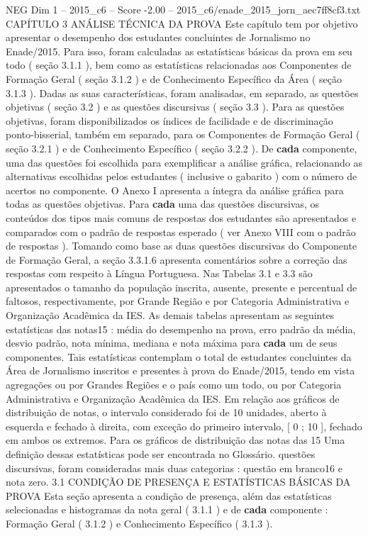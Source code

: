 \begin{textsample}{NEG Dim 1 – 2015\_c6 – Score -2.00 – 2015\_c6/enade\_2015\_jorn\_aec7ff8cf3.txt}  \label{ex:f1_neg_283}
CAPÍTULO 3 ANÁLISE TÉCNICA DA PROVA Este capítulo tem por objetivo apresentar o desempenho dos estudantes concluintes de Jornalismo no Enade/2015.
Para isso, foram calculadas as estatísticas básicas da prova em seu todo ( seção 3.1.1 ), bem como as estatísticas relacionadas aos Componentes de Formação Geral ( seção 3.1.2 ) e de Conhecimento Específico da Área ( seção 3.1.3 ).
Dadas as suas características, foram analisadas, em separado, as questões objetivas ( seção 3.2 ) e as questões discursivas ( seção 3.3 ).
Para as questões objetivas, foram disponibilizados os índices de facilidade e de discriminação ponto-bisserial, também em separado, para os Componentes de Formação Geral ( seção 3.2.1 ) e de Conhecimento Específico ( seção 3.2.2 ).
De \textbf{cada} componente, uma das questões foi escolhida para exemplificar a análise gráfica, relacionando as alternativas escolhidas pelos estudantes ( inclusive o gabarito ) com o número de acertos no componente.
O Anexo I apresenta a íntegra da análise gráfica para todas as questões objetivas.
Para \textbf{cada} uma das questões discursivas, os conteúdos dos tipos mais comuns de respostas dos estudantes são apresentados e comparados com o padrão de respostas esperado ( ver Anexo VIII com o padrão de respostas ).
Tomando como base as duas questões discursivas do Componente de Formação Geral, a seção 3.3.1.6 apresenta comentários sobre a correção das respostas com respeito à Língua Portuguesa.
Nas Tabelas 3.1 e 3.3 são apresentados o tamanho da população inscrita, ausente, presente e percentual de faltosos, respectivamente, por Grande Região e por Categoria Administrativa e Organização Acadêmica da IES.
As demais tabelas apresentam as seguintes estatísticas das notas15 : média do desempenho na prova, erro padrão da média, desvio padrão, nota mínima, mediana e nota máxima para \textbf{cada} um de seus componentes.
Tais estatísticas contemplam o total de estudantes concluintes da Área de Jornalismo inscritos e presentes à prova do Enade/2015, tendo em vista agregações ou por Grandes Regiões e o país como um todo, ou por Categoria Administrativa e Organização Acadêmica da IES.
Em relação aos gráficos de distribuição de notas, o intervalo considerado foi de 10 unidades, aberto à esquerda e fechado à direita, com exceção do primeiro intervalo, [ 0 ; 10 ], fechado em ambos os extremos.
Para os gráficos de distribuição das notas das 15 Uma definição dessas estatísticas pode ser encontrada no Glossário. questões discursivas, foram consideradas mais duas categorias : questão em branco16 e nota zero. 3.1 CONDIÇÃO DE PRESENÇA E ESTATÍSTICAS BÁSICAS DA PROVA Esta seção apresenta a condição de presença, além das estatísticas selecionadas e histogramas da nota geral ( 3.1.1 ) e de \textbf{cada} componente : Formação Geral ( 3.1.2 ) e Conhecimento Específico ( 3.1.3 ).

\end{textsample}
